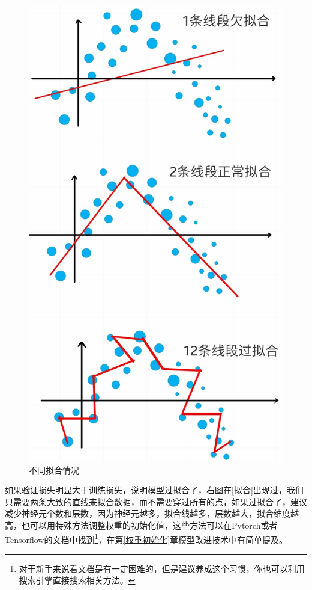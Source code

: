 \documentclass[a5paper, 11pt]{ctexbook}
\begin{document}
\begin{figure}
    \begin{center}
        \includegraphics[scale=0.19]{figures/拟合情况.jpg}
        \caption{不同拟合情况}
    \end{center}
\end{figure}

如果验证损失明显大于训练损失，说明模型过拟合了，右图在\ref{拟合}出现过，我们只需要两条大致的直线来拟合数据，而不需要穿过所有的点，如果过拟合了，建议减少神经元个数和层数，因为神经元越多，拟合线越多，层数越大，拟合维度越高，也可以用特殊方法调整权重的初始化值，这些方法可以在Pytorch或者Tensorflow的文档中找到\footnote{对于新手来说看文档是有一定困难的，但是建议养成这个习惯，你也可以利用搜索引擎直接搜索相关方法。}，在第\ref{权重初始化}章模型改进技术中有简单提及。
\end{document}
